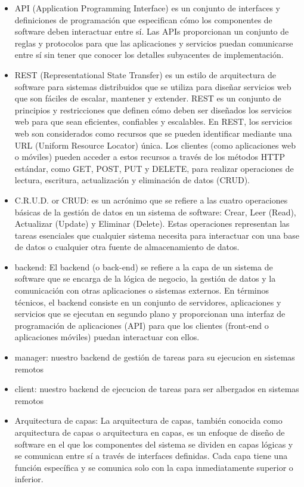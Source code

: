 
\begin{itemize}
	\item API (Application Programming Interface) es un conjunto de interfaces y definiciones de programación que especifican cómo los componentes de software deben interactuar entre sí. Las APIs proporcionan un conjunto de reglas y protocolos para que las aplicaciones y servicios puedan comunicarse entre sí sin tener que conocer los detalles subyacentes de implementación.
	\item REST (Representational State Transfer) es un estilo de arquitectura de software para sistemas distribuidos que se utiliza para diseñar servicios web que son fáciles de escalar, mantener y extender. REST es un conjunto de principios y restricciones que definen cómo deben ser diseñados los servicios web para que sean eficientes, confiables y escalables. En REST, los servicios web son considerados como recursos que se pueden identificar mediante una URL (Uniform Resource Locator) única. Los clientes (como aplicaciones web o móviles) pueden acceder a estos recursos a través de los métodos HTTP estándar, como GET, POST, PUT y DELETE, para realizar operaciones de lectura, escritura, actualización y eliminación de datos (CRUD).
	\item C.R.U.D. or CRUD: es un acrónimo que se refiere a las cuatro operaciones básicas de la gestión de datos en un sistema de software: Crear, Leer (Read), Actualizar (Update) y Eliminar (Delete). Estas operaciones representan las tareas esenciales que cualquier sistema necesita para interactuar con una base de datos o cualquier otra fuente de almacenamiento de datos.
	\item backend: El backend (o back-end) se refiere a la capa de un sistema de software que se encarga de la lógica de negocio, la gestión de datos y la comunicación con otras aplicaciones o sistemas externos. En términos técnicos, el backend consiste en un conjunto de servidores, aplicaciones y servicios que se ejecutan en segundo plano y proporcionan una interfaz de programación de aplicaciones (API) para que los clientes (front-end o aplicaciones móviles) puedan interactuar con ellos.
	\item manager: nuestro backend de gestión de tareas para su ejecucion en sistemas remotos
	\item client: nuestro backend de ejecucion de tareas para ser albergados en sistemas remotos
	\item Arquitectura de capas: La arquitectura de capas, también conocida como arquitectura de capas o arquitectura en capas, es un enfoque de diseño de software en el que los componentes del sistema se dividen en capas lógicas y se comunican entre sí a través de interfaces definidas. Cada capa tiene una función específica y se comunica solo con la capa inmediatamente superior o inferior.

\end{itemize}
